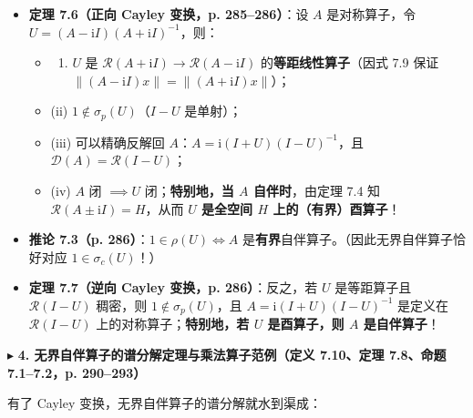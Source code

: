\documentclass[11pt,a4paper]{article}
\providecommand{\tightlist}{\setlength{\itemsep}{1.8pt}\setlength{\parskip}{0pt}}
\newcommand{\SubSubHeading}[1]{%
  \Needspace{6.5\baselineskip}\vspace{5.5pt}\noindent
  \textcolor{AccentMain}{\scriptsize$\blacktriangleright$}\hspace{4pt}%
  {\small\bfseries\color{AccentMain}#1}\par\nopagebreak[4]\vspace{2.5pt}%
}
\begin{document}
\begin{itemize}
\tightlist
\item
  \textbf{定理 7.6（正向 Cayley 变换，p. 285--286）}：设 \(A\) 是对称算子，令 \(U = (A - \mathrm{i}I)(A + \mathrm{i}I)^{-1}\)，则：

  \begin{itemize}
  \tightlist
  \item
    \begin{enumerate}
    \def\labelenumi{(\roman{enumi})}
    \tightlist
    \item
      \(U\) 是 \(\mathcal{R}(A+\mathrm{i}I) \to \mathcal{R}(A-\mathrm{i}I)\) 的\textbf{等距线性算子}（因式 7.9 保证 \(\|(A-\mathrm{i}I)x\| = \|(A+\mathrm{i}I)x\|\)）；
    \end{enumerate}
  \item
    (ii) \textbf{\(1 \notin \sigma_p(U)\)}（\(I - U\) 是单射）；
  \item
    (iii) 可以精确反解回 \(A\)：\textbf{\(A = \mathrm{i}(I+U)(I-U)^{-1}\)}，且 \(\mathcal{D}(A) = \mathcal{R}(I - U)\)；
  \item
    (iv) \(A\) 闭 \(\implies U\) 闭；\textbf{特别地，当 \(A\) 自伴时}，由定理 7.4 知 \(\mathcal{R}(A\pm\mathrm{i}I) = H\)，从而 \textbf{\(U\) 是全空间 \(H\) 上的（有界）酉算子}！
  \end{itemize}
\item
  \textbf{推论 7.3（p. 286）}：\(1 \in \rho(U) \iff A\) 是\textbf{有界}自伴算子。（因此无界自伴算子恰好对应 \(1 \in \sigma_c(U)\)！）
\item
  \textbf{定理 7.7（逆向 Cayley 变换，p. 286）}：反之，若 \(U\) 是等距算子且 \(\mathcal{R}(I-U)\) 稠密，则 \(1 \notin \sigma_p(U)\)，且 \(A = \mathrm{i}(I+U)(I-U)^{-1}\) 是定义在 \(\mathcal{R}(I-U)\) 上的对称算子；\textbf{特别地，若 \(U\) 是酉算子，则 \(A\) 是自伴算子}！
\end{itemize}

\SubSubHeading{4. 无界自伴算子的谱分解定理与乘法算子范例（定义 7.10、定理 7.8、命题 7.1--7.2，p. 290--293）}

有了 Cayley 变换，无界自伴算子的谱分解就水到渠成：
\end{document}
